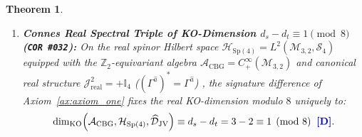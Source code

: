 \documentclass[11pt,a4paper]{article}
\newcommand{\catD}{\text{\textbf{\textcolor{blue!75!black}{[D]}}}}
\theoremstyle{definition}
\theoremstyle{plain}
\newtheorem{theorem}[axiom]{Theorem}
\theoremstyle{remark}
\begin{document}
\begin{theorem}
\begin{enumerate}[label=(\roman*)]
  \item \textbf{Connes Real Spectral Triple of KO-Dimension $d_s - d_t \equiv 1 \pmod 8$ (\texttt{COR~\#032}):}
  On the real spinor Hilbert space $\mathcal{H}_{\mathrm{Sp}(4)} = L^2(\mathcal{M}_{3,2}, \mathcal{S}_4)$ equipped with the $\mathbb{Z}_2$-equivariant algebra $\mathcal{A}_{\mathrm{CBG}} = C^\infty_+(\mathcal{M}_{3,2})$ and canonical real structure $\mathcal{J}_{\mathrm{real}}^2 = +\mathbb{I}_4$ ($(\Gamma^{\hat{a}})^* = \Gamma^{\hat{a}}$) \cite{Connes1996}, the signature difference of Axiom~\ref{ax:axiom_one} fixes the real KO-dimension modulo $8$ uniquely to:
  \begin{equation}\label{eq:c6_ko_dimension_one}
  \dim_{\mathrm{KO}}\!\left(\mathcal{A}_{\mathrm{CBG}}, \mathcal{H}_{\mathrm{Sp}(4)}, \widehat{\mathcal{D}}_{\mathrm{JV}}\right) \equiv d_s - d_t = 3 - 2 \equiv 1 \pmod 8 \;\;\catD.
  \end{equation}


\end{enumerate}
\end{theorem}
\end{document}

